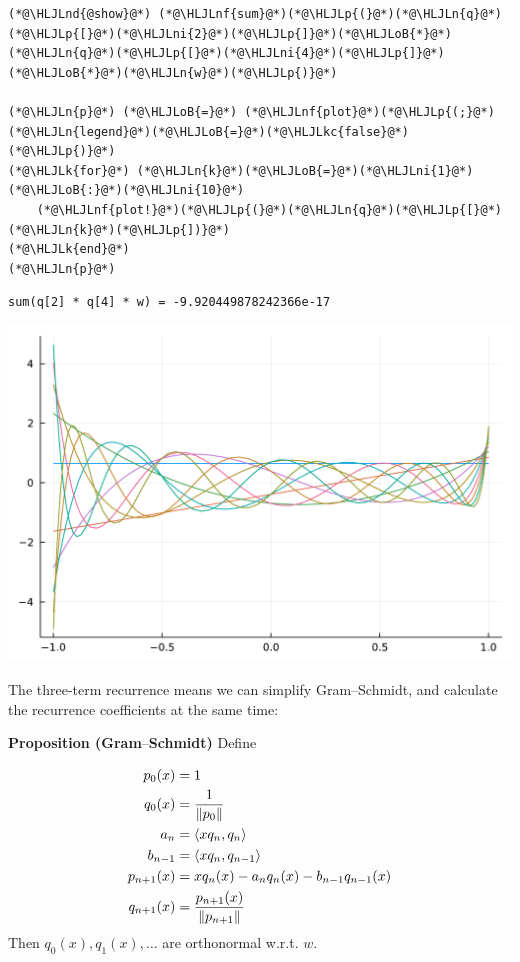 \documentclass[12pt,a4paper]{article}
\newcommand{\HLJLk}[1]{\textcolor[RGB]{148,91,176}{\textbf{#1}}}
\newcommand{\HLJLkc}[1]{\textcolor[RGB]{59,151,46}{\textit{#1}}}
\newcommand{\HLJLn}[1]{#1}
\newcommand{\HLJLnd}[1]{\textcolor[RGB]{214,102,97}{#1}}
\newcommand{\HLJLnf}[1]{\textcolor[RGB]{66,102,213}{#1}}
\newcommand{\HLJLni}[1]{\textcolor[RGB]{59,151,46}{#1}}
\newcommand{\HLJLoB}[1]{\textcolor[RGB]{102,102,102}{\textbf{#1}}}
\newcommand{\HLJLp}[1]{#1}
\def\endash{–}
\begin{document}
\begin{lstlisting}
(*@\HLJLnd{@show}@*) (*@\HLJLnf{sum}@*)(*@\HLJLp{(}@*)(*@\HLJLn{q}@*)(*@\HLJLp{[}@*)(*@\HLJLni{2}@*)(*@\HLJLp{]}@*)(*@\HLJLoB{*}@*)(*@\HLJLn{q}@*)(*@\HLJLp{[}@*)(*@\HLJLni{4}@*)(*@\HLJLp{]}@*)(*@\HLJLoB{*}@*)(*@\HLJLn{w}@*)(*@\HLJLp{)}@*)

(*@\HLJLn{p}@*) (*@\HLJLoB{=}@*) (*@\HLJLnf{plot}@*)(*@\HLJLp{(;}@*) (*@\HLJLn{legend}@*)(*@\HLJLoB{=}@*)(*@\HLJLkc{false}@*)(*@\HLJLp{)}@*)
(*@\HLJLk{for}@*) (*@\HLJLn{k}@*)(*@\HLJLoB{=}@*)(*@\HLJLni{1}@*)(*@\HLJLoB{:}@*)(*@\HLJLni{10}@*)
    (*@\HLJLnf{plot!}@*)(*@\HLJLp{(}@*)(*@\HLJLn{q}@*)(*@\HLJLp{[}@*)(*@\HLJLn{k}@*)(*@\HLJLp{])}@*)
(*@\HLJLk{end}@*)
(*@\HLJLn{p}@*)
\end{lstlisting}

\begin{lstlisting}
sum(q[2] * q[4] * w) = -9.920449878242366e-17
\end{lstlisting}

\includegraphics[width=\linewidth]{jl_dOthw0/OP_methods_7_1.pdf}

The three-term recurrence means we can simplify Gram\ensuremath{\endash}Schmidt, and calculate the recurrence coefficients at the same time:

\textbf{Proposition (Gram\ensuremath{\endash}Schmidt)} Define


\begin{align*}
p_0(x) &= 1 \\
q_0(x) &= {1 \over \| p_0\|}\\
a_n &= \langle x q_n, q_n \rangle \\
b_{n-1} &= \langle x q_n, q_{n-1}\rangle\\
p_{n+1}(x) &= x q_n(x) -  a_n q_n(x) -  b_{n-1} q_{n-1}(x)\\
q_{n+1}(x) &= {p_{n+1}(x) \over \|p_{n+1}\|}
\end{align*}
Then $q_0(x), q_1(x), \ldots$ are orthonormal w.r.t. $w$.
\end{document}
